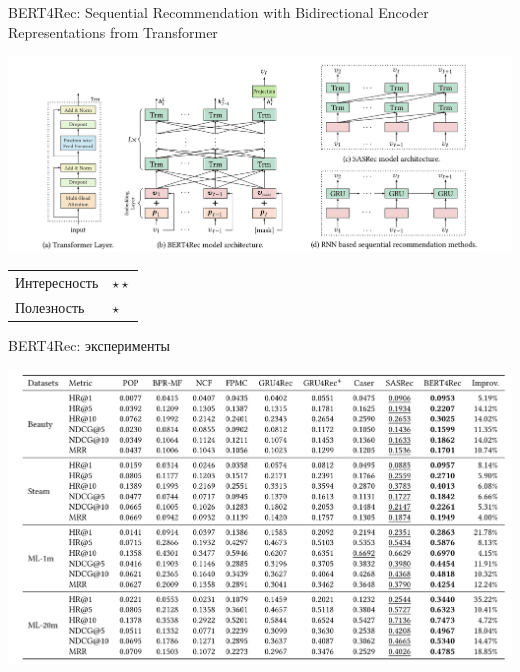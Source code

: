 \documentclass[11pt,aspectratio=169]{beamer}
\begin{document}
\begin{frame}{BERT4Rec: Sequential Recommendation with Bidirectional Encoder Representations from Transformer \cite{BERT4Rec}}

\begin{center}
\includegraphics[scale=0.4]{images/bert4rec.png}
\end{center}

\begin{tabular}{l l}
Интересность & $\star\star$ \\
Полезность & $\star$
\end{tabular}

\end{frame}

\begin{frame}{BERT4Rec: эксперименты}

\begin{center}
\includegraphics[scale=0.45]{images/bert4rec-table.png}
\end{center}

\end{frame}
\end{document}
